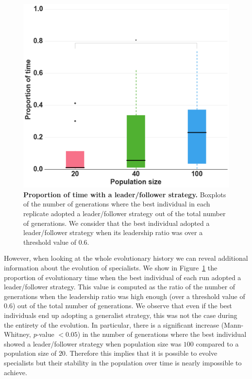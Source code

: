     \begin{figure}[ht]
      \centering
        \includegraphics[scale=0.35]{fig/ArticleRob2/boxplotLeadershipTime.png}
        \caption{\textbf{Proportion of time with a leader/follower strategy.} Boxplots of the number of generations where the best individual in each replicate adopted a leader/follower strategy out of the total number of generations. We consider that the best individual adopted a leader/follower strategy when its leadership ratio was over a threshold value of $0.6$.}
      \label{fig:leadershipTime}
    \end{figure}

    However, when looking at the whole evolutionary history we can reveal additional information about the evolution of specialists. We show in Figure~\ref{fig:leadershipTime} the proportion of evolutionary time when the best individual of each run adopted a leader/follower strategy. This value is computed as the ratio of the number of generations when the leadership ratio was high enough (over a threshold value of $0.6$) out of the total number of generations. We observe that even if the best individuals end up adopting a generalist strategy, this was not the case during the entirety of the evolution. In particular, there is a significant increase (Mann-Whitney, {\em p}-value $< 0.05$) in the number of generations where the best individual showed a leader/follower strategy when population size was $100$ compared to a population size of $20$. Therefore this implies that it is possible to evolve specialists but their stability in the population over time is nearly impossible to achieve.


